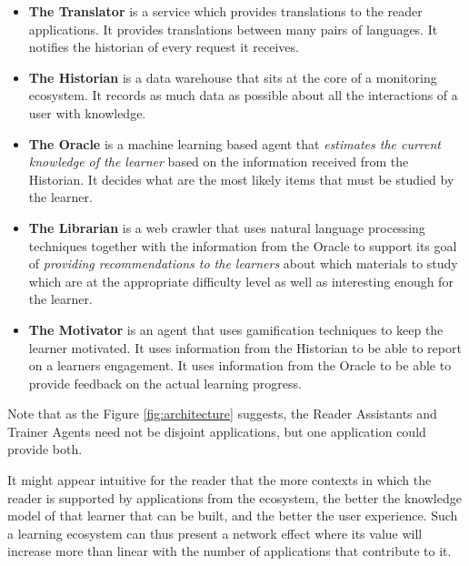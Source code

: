 \newcommand {\archiblock}[1]{\item {\bf #1}}
\begin{itemize}

		\archiblock{The Translator} is a service which provides translations to the reader applications. It provides translations between many pairs of languages. It notifies the historian of every request it receives. 

		\archiblock{The Historian} is a data warehouse that sits at the core of a monitoring ecosystem. It records as much data as possible about all the interactions of a user with knowledge. 

		\archiblock{The Oracle} is a machine learning based agent that {\em estimates the current knowledge of the learner} based on the information received from the Historian. It decides what are the most likely items that must be studied by the learner. 


		\archiblock {The Librarian} is a web crawler that uses natural language processing techniques together with the information from the Oracle to support its goal of {\em providing recommendations to the learners} about which materials to study which are at the appropriate difficulty level as well as interesting enough for the learner.

		\archiblock {The Motivator} is an agent that uses gamification techniques to keep the learner motivated. It uses information from the Historian to be able to report on a learners engagement. It uses information from the Oracle to be able to provide feedback on the actual learning progress. 

\end{itemize}

Note that as the Figure \ref{fig:architecture} suggests, the Reader Assistants and Trainer Agents need not be disjoint applications, but one application could provide both.

It might appear intuitive for the reader that the more contexts in which the reader is supported by applications from the ecosystem, the better the knowledge model of that learner that can be built, and the better the user experience. Such a learning ecosystem can thus present a network effect where its value will increase more than linear with the number of applications that contribute to it.



